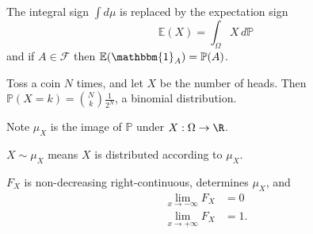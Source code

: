 \documentclass{article}
\newcommand{\1}[1]{\mathbbm{1}_{#1}}
\newcommand{\Prob}{\mathbb{P}}
\newcommand{\E}{\mathbb{E}}
\begin{document}

\begin{notation}
    The integral sign $\int d\mu$ is replaced by the expectation sign
    \begin{equation*}
        \mathbb{E}(X) = \int_\Omega X \, d \Prob
    \end{equation*}
    and if $A \in \mathcal{F}$ then $\E(\1{A}) = \Prob(A)$.
\end{notation}

\begin{eg}
    Toss a coin $N$ times, and let $X$ be the number of heads. Then $\Prob(X = k) = \binom{N}{k} \frac{1}{2^N}$, a binomial distribution.
\end{eg}

Note $\mu_X$ is the image of $\Prob$ under $X: \Omega \to \R$.

\begin{notation}
    $X \sim \mu_X$ means $X$ is distributed according to $\mu_X$.
\end{notation}

\begin{defi}[Cumulative probability function]\hypertarget{def:cdf}
    The function $F_X = \Prob(X \leq x) = \mu_X(-\infty, x]$ is the \textbf{cumulative probability function}.
\end{defi}

\begin{remark}
    $F_X$ is non-decreasing right-continuous, determines $\mu_X$, and
    \begin{equation*} \tag{$*$} \label{eq:cumLimits}
        \begin{aligned}
            \lim_{x \to -\infty} F_X &= 0 \\
            \lim_{x \to +\infty} F_X &= 1.
        \end{aligned}
    \end{equation*}
\end{remark}
\end{document}
